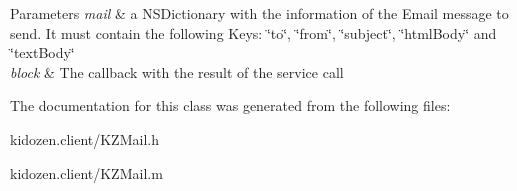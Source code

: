 \begin{DoxyParams}{Parameters}
{\em mail} & a N\-S\-Dictionary with the information of the Email message to send. It must contain the following Keys\-: \char`\"{}to\char`\"{}, \char`\"{}from\char`\"{}, \char`\"{}subject\char`\"{}, \char`\"{}html\-Body\char`\"{} and \char`\"{}text\-Body\char`\"{} \\
\hline
{\em block} & The callback with the result of the service call \\
\hline
\end{DoxyParams}


The documentation for this class was generated from the following files\-:\begin{DoxyCompactItemize}
\item 
kidozen.\-client/K\-Z\-Mail.\-h\item 
kidozen.\-client/K\-Z\-Mail.\-m\end{DoxyCompactItemize}
